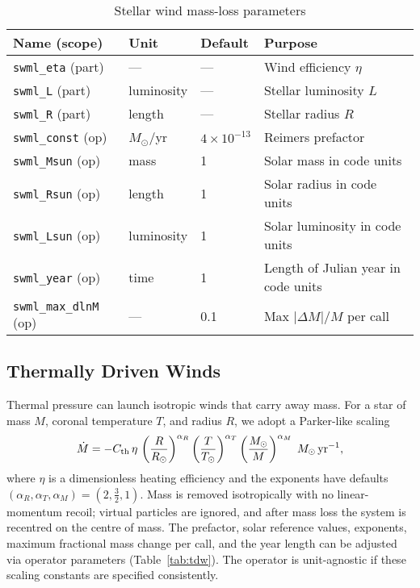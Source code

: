\documentclass[11pt]{article}
\begin{document}
\begin{table}[h]
\centering\footnotesize
\caption{Stellar wind mass-loss parameters}
\label{tab:swml}
\begin{tabular}{@{}llll@{}}
\toprule
Name (scope) & Unit & Default & Purpose \\
\midrule
\texttt{swml\_eta} (part) & — & — & Wind efficiency $\eta$\\
\texttt{swml\_L}   (part) & luminosity & — & Stellar luminosity $L$\\
\texttt{swml\_R}   (part) & length & — & Stellar radius $R$\\[0.2em]
\texttt{swml\_const} (op) & $M_\odot$/yr & $4\times10^{-13}$ & Reimers prefactor\\
\texttt{swml\_Msun}  (op) & mass & 1 & Solar mass in code units\\
\texttt{swml\_Rsun}  (op) & length & 1 & Solar radius in code units\\
\texttt{swml\_Lsun}  (op) & luminosity & 1 & Solar luminosity in code units\\
\texttt{swml\_year}  (op) & time & 1 & Length of Julian year in code units\\
\texttt{swml\_max\_dlnM} (op) & — & 0.1 & Max $|\Delta M|/M$ per call\\
\bottomrule
\end{tabular}
\end{table}

\subsection{Thermally Driven Winds}
\label{sec:tdw}

Thermal pressure can launch isotropic winds that carry away mass. For a star
of mass $M$, coronal temperature $T$, and radius $R$, we adopt a Parker-like
scaling
\[
\dot M = -C_{\rm th}\,\eta\,\left(\frac{R}{R_\odot}\right)^{\alpha_R}
                   \left(\frac{T}{T_\odot}\right)^{\alpha_T}
                   \left(\frac{M_\odot}{M}\right)^{\alpha_M}
\;M_\odot\,\mathrm{yr}^{-1},
\]
where $\eta$ is a dimensionless heating efficiency and the exponents have
defaults $(\alpha_R,\alpha_T,\alpha_M)=(2,\tfrac{3}{2},1)$.  Mass is removed
isotropically with no linear-momentum recoil; virtual particles are ignored,
and after mass loss the system is recentred on the centre of mass.  The
prefactor, solar reference values, exponents, maximum fractional mass change
per call, and the year length can be adjusted via operator parameters
(Table~\ref{tab:tdw}). The operator is unit-agnostic if these scaling
constants are specified consistently.
\end{document}
